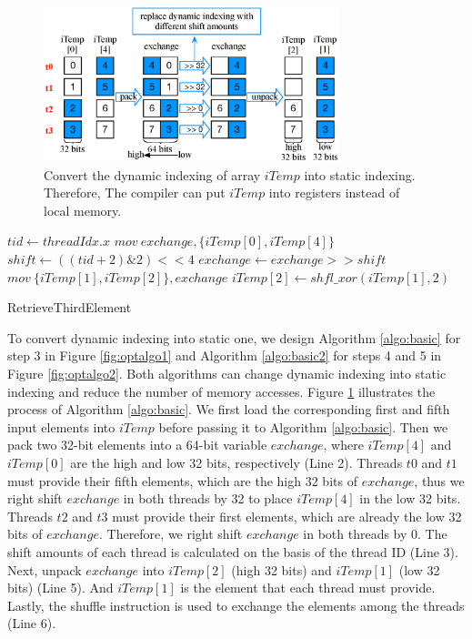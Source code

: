 \begin{figure}[t!]
	\centering
	\includegraphics[width=\columnwidth,height=4.5cm]{./figure/exchange.eps}
\caption{Convert the dynamic indexing of array $iTemp$ into static indexing. Therefore, The compiler can put $iTemp$ into registers instead of local memory.}
\label{fig:exchange}
\end{figure}


\begin{algorithm}[t!]
	$tid \gets threadIdx.x$\;
	$mov\ exchange, \{iTemp[0], iTemp[4]\}$\;
	$shift \gets ((tid+2)\&2)<<4$\;
	$exchange \gets exchange >> shift$\;
	$mov\ \{iTemp[1],iTemp[2]\}, exchange$\;
	$iTemp[2] \gets shfl\_xor(iTemp[1],2)$\;	
	
	\caption{RetrieveThirdElement}
	\label{algo:basic}
\end{algorithm}

To convert dynamic indexing into static one, we design Algorithm \ref{algo:basic} for step 3 in Figure \ref{fig:optalgo1} and Algorithm \ref{algo:basic2} for steps 4 and 5 in Figure \ref{fig:optalgo2}. Both algorithms can change dynamic indexing into static indexing and reduce the number of memory accesses. Figure \ref{fig:exchange} illustrates the process of Algorithm \ref{algo:basic}. We first load the corresponding first and fifth input elements into $iTemp$ before passing it to Algorithm \ref{algo:basic}. Then we pack two 32-bit elements into a 64-bit variable $exchange$, where $iTemp[4]$ and $iTemp[0]$ are the high and low 32 bits, respectively (Line 2).  Threads $t0$ and $t1$ must provide their fifth elements, which are the high 32 bits of $exchange$, thus we right shift $exchange$ in both threads by 32 to place $iTemp[4]$ in the low 32 bits. Threads $t2$ and $t3$ must provide their first elements, which are already the low 32 bits of $exchange$. Therefore, we right shift $exchange$ in both threads by 0. The shift amounts of each thread is calculated on the basis of the thread ID (Line 3). Next, unpack $exchange$ into $iTemp[2]$ (high 32 bits) and $iTemp[1]$ (low 32 bits) (Line 5). And $iTemp[1]$ is the element that each thread must provide. Lastly, the shuffle instruction is used to exchange the elements among the threads (Line 6).

